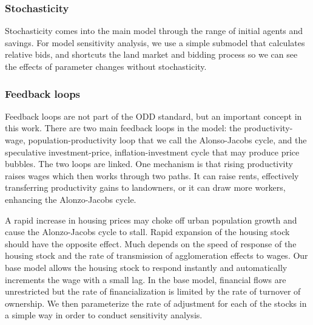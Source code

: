 {{\subsubsection{Stochasticity}
Stochasticity comes into the main model through the range of initial agents and savings. For model sensitivity analysis, we use a simple submodel that calculates relative bids, and shortcuts the land market and bidding process so we can see the effects of parameter changes without stochasticity. 

\subsubsection{Feedback loops}
Feedback loops are not part of the ODD standard, but an important concept in this work. 
There are two main \glspl{feedback loop} in the model: the productivity-wage, population-productivity loop that we call the Alonso-Jacobs cycle, and the speculative investment-price, inflation-investment cycle that may produce price bubbles. 
The two loops are linked. One mechanism is that rising productivity raises wages which then works through two paths. It can raise rents, effectively transferring productivity gains to landowners, or it can draw more workers, enhancing the \Gls{Alonzo-Jacobs cycle}. 

A rapid increase in housing prices may choke off urban population growth and cause the \Gls{Alonzo-Jacobs cycle} to stall. Rapid expansion of the housing stock should have the opposite effect. Much depends on the speed of response of the housing stock and the rate of transmission of agglomeration effects to wages. Our base model allows the housing stock to respond instantly and automatically increments the wage with a small lag. In the base model, financial flows are unrestricted but the rate of financialization is limited by the rate of turnover of ownership. We then parameterize the rate of adjustment for each of the stocks in a simple way in order to conduct sensitivity analysis.

}}
